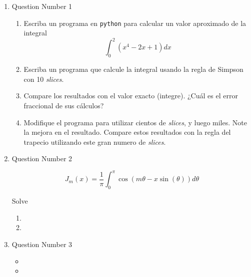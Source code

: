 \documentclass[11pt,letterpaper]{article}
\begin{document}
\begin{enumerate}

\item Question Number 1

\begin{enumerate}
	\item Escriba un programa en \verb|python| para calcular un valor aproximado de la integral
	\begin{equation}
	\int_0^2\left(x^4 - 2x +1 \right)dx
	\end{equation}
	\item Escriba un programa que calcule la integral usando la regla de Simpson con 10 \textit{slices}.
	\item Compare los resultados con el valor exacto (integre). ¿Cuál es el error fraccional de sus cálculos?
	\item Modifique el programa para utilizar cientos de \textit{slices}, y luego miles. Note la mejora en el resultado. Compare estos resultados con la regla del trapecio utilizando este gran numero de \textit{slices}.
\end{enumerate}

\item Question Number 2

\lipsum[2]

\noindent

\begin{equation}
J_m(x)=\frac{1}{\pi}\int_0^\pi \cos(m\theta-x\sin(\theta))d\theta
\end{equation}

\noindent
\lipsum[1]

Solve

\begin{enumerate}
	\item \lipsum[66]
	\item \lipsum[75]
\end{enumerate}

\item Question Number 3

\lipsum[23]
\begin{itemize}
	\item \lipsum[75]
    \item \lipsum[66]
\end{itemize}

\end{enumerate}
\end{document}
